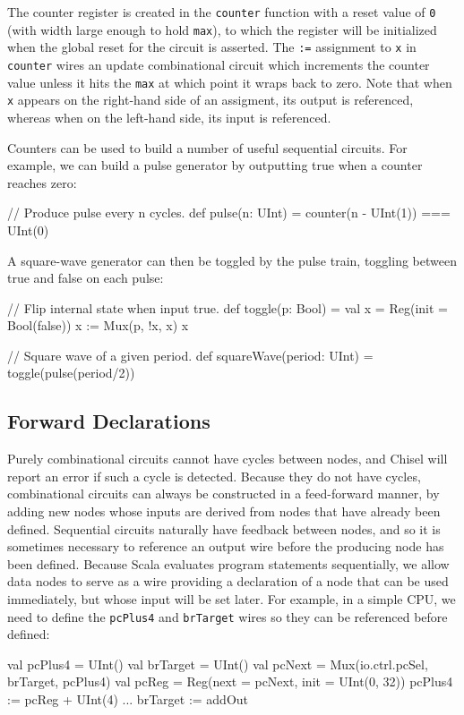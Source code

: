 \documentclass[twocolumn,10pt]{article}
\begin{document}
\noindent
The counter register is created in the \verb!counter! function 
with a reset value of \verb!0! (with width large enough to hold \verb+max+),
to which the register will be initialized when the global reset for the circuit is asserted.
The \verb!:=! assignment to \verb!x! in \verb!counter! wires an update combinational circuit 
which increments the counter value unless it hits the \verb+max+ at which point it wraps back to zero.
Note that when \verb!x! appears on the right-hand side of
an assigment, its output is referenced, whereas when on the left-hand
side, its input is referenced.

Counters can be used to build a number of useful sequential circuits.
For example, we can build a pulse generator by outputting true when
a counter reaches zero:
\begin{scala}
// Produce pulse every n cycles.
def pulse(n: UInt) = counter(n - UInt(1)) === UInt(0)
\end{scala}

\noindent
A square-wave generator can then be toggled by the pulse train,
toggling between true and false on each pulse:
\begin{scala}[escapechar=@]
// Flip internal state when input true.
def toggle(p: Bool) = {
  val x = Reg(init = Bool(false))
  x := Mux(p, !x, x)
  x
}

// Square wave of a given period.
def squareWave(period: UInt) = toggle(pulse(period/2))
\end{scala}

\subsection{Forward Declarations}

Purely combinational circuits cannot have cycles between nodes, and
Chisel will report an error if such a cycle is detected.  Because they
do not have cycles, combinational circuits can always be constructed
in a feed-forward manner, by adding new nodes whose inputs are derived
from nodes that have already been defined.  Sequential circuits
naturally have feedback between nodes, and so it is sometimes
necessary to reference an output wire before the producing node has
been defined.  Because Scala evaluates program statements
sequentially, we allow data nodes to serve as a wire providing
a declaration of a node that can be used immediately, but whose
input will be set later.  
For example, in a simple CPU, we need to define the \verb!pcPlus4!
and \verb!brTarget! wires so they can be referenced before defined:
\begin{scala}
val pcPlus4  = UInt()
val brTarget = UInt()
val pcNext   = Mux(io.ctrl.pcSel, brTarget, pcPlus4)
val pcReg    = Reg(next = pcNext, init = UInt(0, 32))
pcPlus4     := pcReg + UInt(4)
...
brTarget    := addOut
\end{scala}
\end{document}
